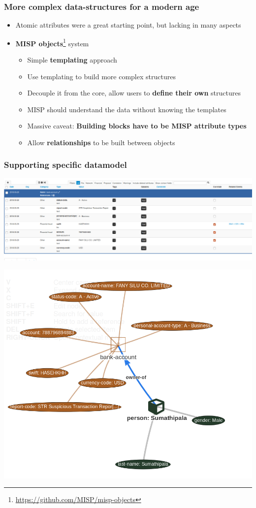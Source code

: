 \begin{frame}
  \frametitle{More complex data-structures for a modern age}
  \begin{itemize}
    \item Atomic attributes were a great starting point, but lacking in many aspects
    \item {\bf MISP objects}\footnote{\url{https://github.com/MISP/misp-objects}} system
    \begin{itemize}
      \item Simple {\bf templating} approach
      \item Use templating to build more complex structures
      \item Decouple it from the core, allow users to {\bf define their own} structures
      \item MISP should understand the data without knowing the templates
      \item Massive caveat: {\bf Building blocks have to be MISP attribute types}
      \item Allow {\bf relationships} to be built between objects
    \end{itemize}
  \end{itemize}
\end{frame}

\begin{frame}
  \frametitle{Supporting specific datamodel}
  \begin{center}
    \includegraphics[scale=0.24]{bankaccount.png}
  \end{center}
  \begin{center}
    \includegraphics[scale=0.18]{bankview.png}
  \end{center}
\end{frame}

